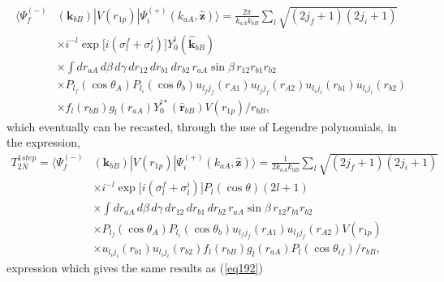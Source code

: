 \begin{equation}\label{eq7_2_47}
  \begin{split}
  \langle \Psi_f^{(-)}&(\mathbf{k}_{bB})|V(r_{1p})|\Psi_i^{(+)}(k_{aA},\hat {\mathbf{z}})\rangle=\frac{2\pi}{k_{aA}k_{bB}}\sum_{l}
  \sqrt{(2j_f+1)(2j_i+1)}\\
  &\times
 i^{-l}\exp\bigl[i(\sigma_{l}^f+\sigma_{l}^i)\bigr]Y_{0}^{l}(\hat{\mathbf{k}}_{bB})\\
  &\times \int dr_{aA} \, d\beta\, d\gamma \, dr_{12}\,dr_{b1}\,dr_{b2}\,r_{aA}\sin\beta \, r_{12}r_{b1}r_{b2} \\
  &\times P_{l_f}(\cos \theta_A)
  P_{l_i}(\cos \theta_b)u_{l_f j_f}(r_{A1})u_{l_f j_f}(r_{A2})u_{l_i j_i}(r_{b1})u_{l_i j_i}(r_{b2})\\
  &\times f_{l}(r_{bB})g_{l}(r_{aA})Y_{0}^{l*}(\hat{\mathbf{r}}_{bB}) V(r_{1p})/r_{bB},
  \end{split}
\end{equation}
which eventually can be recasted, through the use of Legendre polynomials, in the expression,
\begin{equation}\label{eq7_2_48}
  \begin{split}
  T^{1step}_{2N}=\langle \Psi_f^{(-)}&(\mathbf{k}_{bB})|V(r_{1p})|\Psi_i^{(+)}(k_{aA},\hat {\mathbf{z}})\rangle=\frac{1}{2k_{aA}k_{bB}}\sum_{l}
  \sqrt{(2j_f+1)(2j_i+1)}\\
  &\times
 i^{-l}\exp\bigl[i(\sigma_{l}^f+\sigma_{l}^i)\bigr]P_l(\cos\theta)(2l+1)\\
  &\times \int dr_{aA} \, d\beta\, d\gamma \, dr_{12}\,dr_{b1}\,dr_{b2}\,r_{aA}\sin\beta \, r_{12}r_{b1}r_{b2} \\
  &\times P_{l_f}(\cos \theta_A)
  P_{l_i}(\cos \theta_b)u_{l_f j_f}(r_{A1})u_{l_f j_f}(r_{A2})V(r_{1p})\\
  &\times u_{l_i j_i}(r_{b1})u_{l_i j_i}(r_{b2})f_{l}(r_{bB})g_{l}(r_{aA})P_l(\cos\theta_{if}) /r_{bB},
  \end{split}
\end{equation}
expression which gives the same results as (\ref{eq192})

